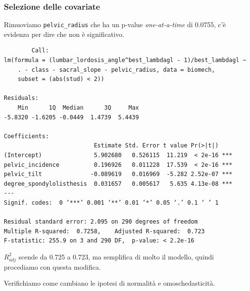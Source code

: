 \documentclass{beamer}
\begin{document}
\begin{frame}[fragile]
\frametitle{Selezione delle covariate}
	Rimuoviamo \texttt{pelvic\_radius} che ha un p-value \textit{one-at-a-time} di 0.0755, c'è evidenza per dire che non è significativo.

	{\tiny
	\begin{verbatim}
		Call:
lm(formula = (lumbar_lordosis_angle^best_lambdagl - 1)/best_lambdagl ~ 
    . - class - sacral_slope - pelvic_radius, data = biomech, 
    subset = (abs(stud) < 2))

Residuals:
    Min      1Q  Median      3Q     Max 
-5.8320 -1.6205 -0.0449  1.4739  5.4439 

Coefficients:
                          Estimate Std. Error t value Pr(>|t|)    
(Intercept)               5.902680   0.526115  11.219  < 2e-16 ***
pelvic_incidence          0.196926   0.011228  17.539  < 2e-16 ***
pelvic_tilt              -0.089619   0.016969  -5.282 2.52e-07 ***
degree_spondylolisthesis  0.031657   0.005617   5.635 4.13e-08 ***
---
Signif. codes:  0 ‘***’ 0.001 ‘**’ 0.01 ‘*’ 0.05 ‘.’ 0.1 ‘ ’ 1

Residual standard error: 2.095 on 290 degrees of freedom
Multiple R-squared:  0.7258,	Adjusted R-squared:  0.723 
F-statistic: 255.9 on 3 and 290 DF,  p-value: < 2.2e-16
	\end{verbatim}
	}
\end{frame}



\begin{frame}
	$R^2_{adj}$ scende da 0.725 a 0.723, ma semplifica di molto il modello, quindi procediamo con questa modifica.

	Verifichiamo come cambiano le ipotesi di normalità e omoschedasticità.
\end{frame}
\end{document}
